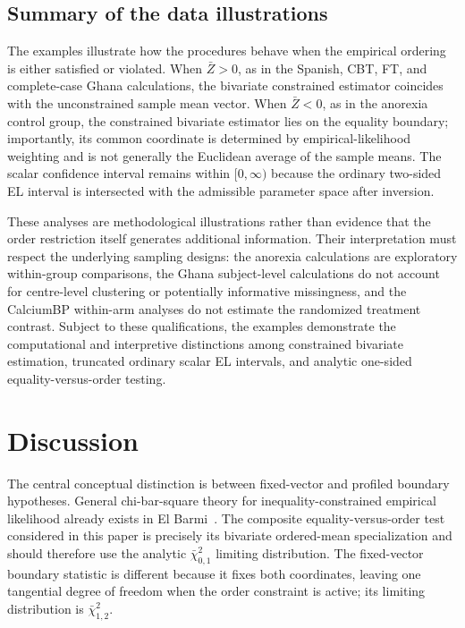 \documentclass[11pt]{article}
\theoremstyle{remark}
\newcommand{\E}{\mathbb{E}}
\begin{document}



\subsection{Summary of the data illustrations}

The examples illustrate how the procedures behave when the empirical ordering is either satisfied or violated. When $\bar Z>0$, as in the Spanish, CBT, FT, and complete-case Ghana calculations, the bivariate constrained estimator coincides with the unconstrained sample mean vector. When $\bar Z<0$, as in the anorexia control group, the constrained bivariate estimator lies on the equality boundary; importantly, its common coordinate is determined by empirical-likelihood weighting and is not generally the Euclidean average of the sample means. The scalar confidence interval remains within $[0,\infty)$ because the ordinary two-sided EL interval is intersected with the admissible parameter space after inversion.

These analyses are methodological illustrations rather than evidence that the order restriction itself generates additional information. Their interpretation must respect the underlying sampling designs: the anorexia calculations are exploratory within-group comparisons, the Ghana subject-level calculations do not account for centre-level clustering or potentially informative missingness, and the CalciumBP within-arm analyses do not estimate the randomized treatment contrast. Subject to these qualifications, the examples demonstrate the computational and interpretive distinctions among constrained bivariate estimation, truncated ordinary scalar EL intervals, and analytic one-sided equality-versus-order testing.


\section{Discussion}

The central conceptual distinction is between fixed-vector and profiled boundary hypotheses. General chi-bar-square theory for inequality-constrained empirical likelihood already exists in El Barmi~\cite{el1996empirical}. The composite equality-versus-order test considered in this paper is precisely its bivariate ordered-mean specialization and should therefore use the analytic $\bar{\chi}^{2}_{0,1}$ limiting distribution. The fixed-vector boundary statistic is different because it fixes both coordinates, leaving one tangential degree of freedom when the order constraint is active; its limiting distribution is $\bar{\chi}^{2}_{1,2}$.
\end{document}

